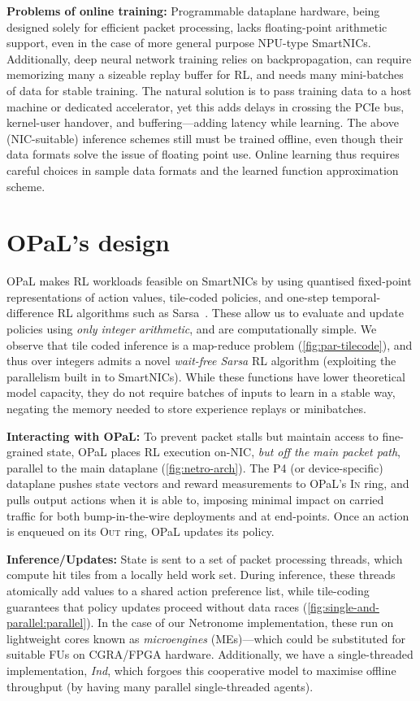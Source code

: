 \documentclass[
sigconf,natbib=false
]{acmart}
\newcommand{\fakepara}[1]{\noindent\textbf{#1:}}
\newcommand{\approachshort}{OPaL}
\newcommand{\Indfw}{\emph{Ind}}
\newcommand{\indfw}{\Indfw}
\newcommand{\inring}{\textsc{In}}
\newcommand{\outring}{\textsc{Out}}
\begin{document}
\fakepara{Problems of online training}
Programmable dataplane hardware, being designed solely for efficient packet processing, lacks floating-point arithmetic support, even in the case of more general purpose NPU-type SmartNICs.
Additionally, deep neural network training relies on backpropagation, can require memorizing many a sizeable replay buffer for RL, and needs many mini-batches of data for stable training.
The natural solution is to pass training data to a host machine or dedicated accelerator, yet this adds delays in crossing the PCIe bus, kernel-user handover, and buffering---adding latency while learning.
The above (NIC-suitable) inference schemes still must be trained offline, even though their data formats solve the issue of floating point use.
Online learning thus requires careful choices in sample data formats and the learned function approximation scheme.

\section{\approachshort{}'s design}
\approachshort{} makes RL workloads feasible on SmartNICs by using quantised fixed-point representations of action values, tile-coded policies, and one-step temporal-difference RL algorithms such as Sarsa~\parencite{RL2E}.
These allow us to evaluate and update policies using \emph{only integer arithmetic}, and are computationally simple.
We observe that tile coded inference is a map-reduce problem (\cref{fig:par-tilecode}), and thus over integers admits a novel \emph{wait-free Sarsa} RL algorithm (exploiting the parallelism built in to SmartNICs).
While these functions have lower theoretical model capacity, they do not require batches of inputs to learn in a stable way, negating the memory needed to store experience replays or minibatches.

\fakepara{Interacting with \approachshort{}}
To prevent packet stalls but maintain access to fine-grained state, \approachshort{} places RL execution on-NIC, \emph{but off the main packet path}, parallel to the main dataplane (\cref{fig:netro-arch}).
The P4 (or device-specific) dataplane pushes state vectors and reward measurements to \approachshort{}'s \inring{} ring, and pulls output actions when it is able to, imposing minimal impact on carried traffic for both bump-in-the-wire deployments and at end-points.
Once an action is enqueued on its \outring{} ring, \approachshort{} updates its policy.

\fakepara{Inference/Updates}
State is sent to a set of packet processing threads, which compute hit tiles from a locally held work set.
During inference, these threads atomically add values to a shared action preference list, while tile-coding guarantees that policy updates proceed without data races (\cref{fig:single-and-parallel:parallel}).
In the case of our Netronome implementation, these run on lightweight cores known as \emph{microengines} (MEs)---which could be substituted for suitable FUs on CGRA/FPGA hardware.
Additionally, we have a single-threaded implementation, \indfw, which forgoes this cooperative model to maximise offline throughput (by having many parallel single-threaded agents).
\end{document}
